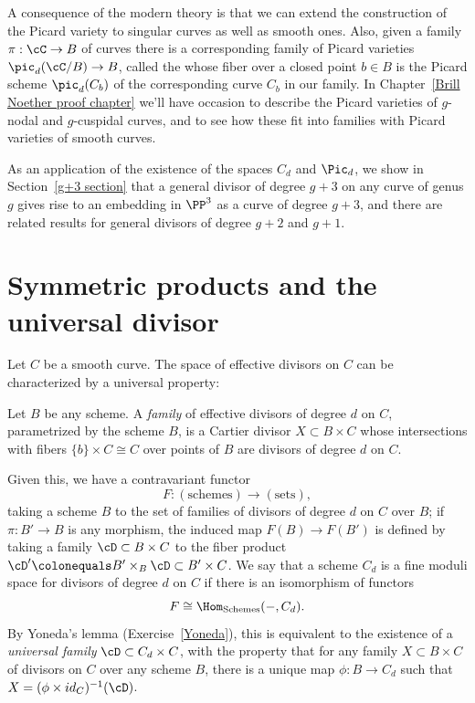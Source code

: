A consequence of the modern theory is that we can extend the
%
construction of the Picard variety to singular curves as well as smooth
ones. Also, given a family $\pi : \cC \to B$ of curves there is a
corresponding family of Picard varieties $\pic_d(\cC/B) \to B$, called
the 
%
 whose
fiber over a closed point $b\in B$ is the Picard scheme $\pic_d(C_b)$
of the corresponding curve $C_b$ in our family.
In Chapter~\ref{Brill Noether proof chapter} we'll have occasion to
describe the Picard varieties of $g$-nodal and $g$-cuspidal curves, and
to see how these fit into families with Picard varieties of smooth curves.

As an application of the existence of the spaces $C_d$ and $\Pic_d$, we show in Section~\ref{g+3 section} that a general divisor of degree $g+3$ on any curve of genus $g$ gives rise to an embedding in $\PP^3$ as a curve of degree $g+3$, and there are related results for general divisors of degree $g+2$ and $g+1$. 

\section{Symmetric products and the universal divisor}\label{symmetric section}

Let $C$ be a smooth curve. The space of effective divisors on $C$ can be characterized by a universal property:

\begin{definition}
Let $B$ be any scheme. A 
\emph{family}
of effective divisors of degree
%
$d$ on $C$, parametrized by the scheme $B$, is a 
Cartier divisor
%
$X\subset B\times C$ whose intersections with fibers $\{b\} \times C
\cong C$ over points of $B$ are divisors of degree $d$ on $C$.
\end{definition}

Given this, we have a contravariant functor 
$$
F : (\textrm{schemes}) \to (\textrm{sets}),
$$
taking a scheme $B$ to the set of families of divisors of degree $d$
on $C$ over $B$; if $\pi : B' \to B$ is any morphism, the induced map
$F(B) \to F(B')$ is defined by taking a family $\cD \subset B \times C$ 
to the fiber product $\cD' \colonequals  B' \times_B \cD \subset B' \times C$. 
We say that a scheme $C_d$ is a 
fine moduli space
%
%
for divisors of degree $d$ on $C$ if there is an isomorphism of functors
$$
F \cong \Hom_{\mathrm{Schemes}}( -, C_d).
$$
By 
Yoneda's lemma
%
(Exercise~\ref{Yoneda}), this is equivalent to the
existence of a 
\emph{universal family}
%
$\cD \subset C_d \times C$,
with the property that for any family $X \subset B \times C$ of
divisors on $C$ over any scheme $B$, there is a unique map $\phi : B
\to C_d$ such that $X = (\phi \times id_{C})^{-1}(\cD)$.

